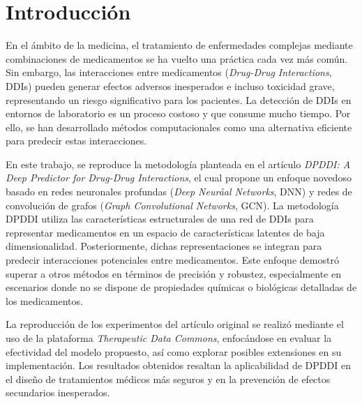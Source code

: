 \chapter*{Introducción}

En el ámbito de la medicina, el tratamiento de enfermedades complejas mediante combinaciones de medicamentos se ha vuelto una práctica cada vez más común. Sin embargo, las interacciones entre medicamentos (\textit{Drug-Drug Interactions}, DDIs) pueden generar efectos adversos inesperados e incluso toxicidad grave, representando un riesgo significativo para los pacientes. La detección de DDIs en entornos de laboratorio es un proceso costoso y que consume mucho tiempo. Por ello, se han desarrollado métodos computacionales como una alternativa eficiente para predecir estas interacciones.

En este trabajo, se reproduce la metodología planteada en el artículo \textit{DPDDI: A Deep Predictor for Drug-Drug Interactions}, el cual propone un enfoque novedoso basado en redes neuronales profundas (\textit{Deep Neuråal Networks}, DNN) y redes de convolución de grafos (\textit{Graph Convolutional Networks}, GCN). La metodología DPDDI utiliza las características estructurales de una red de DDIs para representar medicamentos en un espacio de características latentes de baja dimensionalidad. Posteriormente, dichas representaciones se integran para predecir interacciones potenciales entre medicamentos. Este enfoque demostró superar a otros métodos en términos de precisión y robustez, especialmente en escenarios donde no se dispone de propiedades químicas o biológicas detalladas de los medicamentos.

La reproducción de los experimentos del artículo original se realizó mediante el uso de la plataforma \textit{Therapeutic Data Commons}, enfocándose en evaluar la efectividad del modelo propuesto, así como explorar posibles extensiones en su implementación. Los resultados obtenidos resaltan la aplicabilidad de DPDDI en el diseño de tratamientos médicos más seguros y en la prevención de efectos secundarios inesperados. 